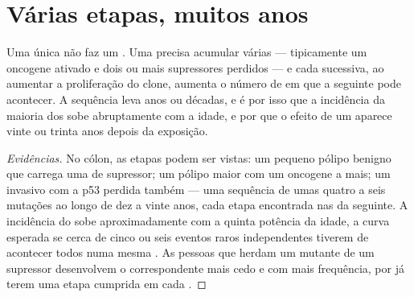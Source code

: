 \section{Várias etapas, muitos anos}

\begin{proposition}\label{prop:g11:cancer:multistep}
Uma única  não faz um . Uma  precisa acumular
várias --- tipicamente um oncogene ativado e dois ou mais supressores
perdidos --- e cada  sucessiva, ao aumentar a proliferação do
clone, aumenta o número de  em que a seguinte pode acontecer. A
sequência leva anos ou décadas, e é por isso que a incidência da
maioria dos  sobe abruptamente com a idade, e por que o efeito
de um  aparece vinte ou trinta anos depois da exposição.
\end{proposition}
\begin{proof}[Evidências]
No cólon, as etapas podem ser vistas: um pequeno pólipo benigno que
carrega uma  de supressor; um pólipo maior com um oncogene a
mais; um  invasivo com a p53 perdida também --- uma sequência de
umas quatro a seis mutações ao longo de dez a vinte anos, cada etapa
encontrada nas  da seguinte. A incidência do  sobe
aproximadamente com a quinta potência da idade, a curva esperada se
cerca de cinco ou seis eventos raros independentes tiverem de acontecer
todos numa mesma . As pessoas que herdam um  mutante de um
 supressor desenvolvem o  correspondente mais cedo e com mais
frequência, por já terem uma etapa cumprida em cada .
\end{proof}

